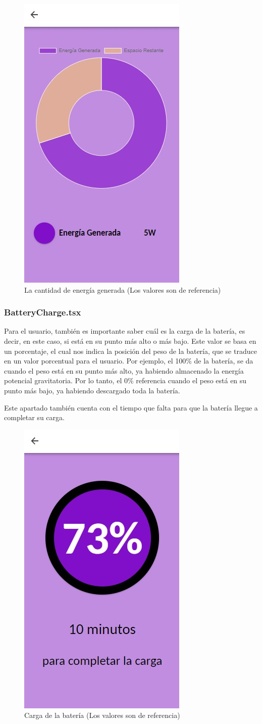                     \begin{figure} [H]
                        \centering
                        \includegraphics[width=0.25\linewidth]{Imagenes/Aplicación/Generated.jpg}
                        \caption{La cantidad de energía generada (Los valores son de referencia)}
                        \label{fig:a3}
                    \end{figure}
                
                \subsubsection{BatteryCharge.tsx}
                    Para el usuario, también es importante saber cuál es la carga de la batería, es decir, en este caso, si está en su punto más alto o más bajo. Este valor se basa en un porcentaje, el cual nos indica la posición del peso de la batería, que se traduce en un valor porcentual para el usuario. Por ejemplo, el 100\% de la batería, se da cuando el peso está en su punto más alto, ya habiendo almacenado la energía potencial gravitatoria. Por lo tanto, el 0\% referencia cuando el peso está en su punto más bajo, ya habiendo descargado toda la batería.\par
                    Este apartado también cuenta con el tiempo que falta para que la batería llegue a completar su carga.\par
    
                    \begin{figure} [H]
                        \centering
                        \includegraphics[width=0.25\linewidth]{Imagenes/Aplicación/Charge.jpg}
                        \caption{Carga de la batería (Los valores son de referencia)}
                        \label{fig:a4}
                    \end{figure}
                
